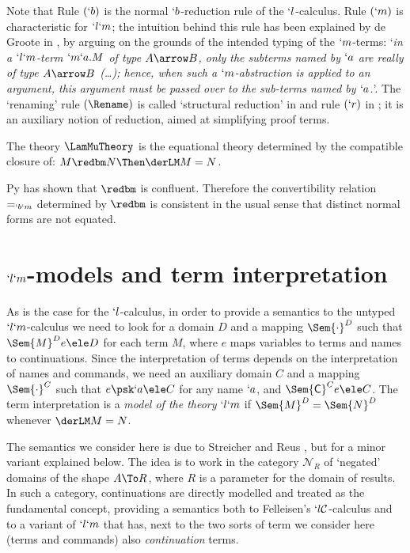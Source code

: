 \documentclass{CSML}
\begin{document}
Note that Rule $(`b)$ is the normal $`b$-reduction rule of the $`l$-calculus. 
Rule $(`m)$ is characteristic for $`l`m$; the intuition behind this rule has been explained by de Groote in \cite{deGroote'94}, by arguing on the grounds of the intended typing of the $`m$-terms: `\emph{in a $`l`m$-term $`m`a.M$ of type $A\arrow B$, only the subterms named by $`a$ are \emph{really} of type $A\arrow B$ (\ldots); hence, when such a $`m$-abstraction is applied to an argument, this argument must be passed over to the sub-terms named by $`a$.}'. 
The `renaming' rule $(\Rename)$ is called `structural reduction' in \cite{Parigot'92} and rule $(`r)$ in \cite{Py-PhD'98}; it is an auxiliary notion of reduction, aimed at simplifying proof terms.

 \begin{defi} \label{def:theories}
The theory $ \LamMuTheory$ is the equational theory determined by the compatible closure of: $M \redbm N \Then \derLM M = N $.
 \end{defi}

Py \cite{Py-PhD'98} has shown that %
$ \redbm$ is confluent.
Therefore the convertibility relation $=_{`b`m}$ determined by $ \redbm$ is consistent in the usual sense that distinct normal forms are not equated.

 \section{\texorpdfstring{$`l`m$}{lambda-mu}-models and term interpretation} \label{sec:semantics}

As is the case for the $`l$-calculus, in order to provide a semantics to the untyped $`l`m$-calculus we need to look for a domain $D$ and a mapping $\Sem{ \cdot}^D$ such that $\Sem{ M }^D{ e } \ele D$ for each term $M$, where $e$ maps variables to terms and names to continuations. 
Since the interpretation of terms depends on the interpretation of names and commands, we need an auxiliary domain $C$ and a mapping $\Sem{ \cdot}^C$ such that $e \psk `a \ele C$ for any name $`a$, and $\Sem{ \Cmd}^C{ e } \ele C$. The term interpretation is a \emph{model of the theory} $`l`m$ if $\Sem{ M }^D = \Sem{ N }^D$ whenever $\derLM M = N$.

The semantics we consider here is due to Streicher and Reus \cite{Streicher-Reus'98}, but for a minor variant explained below.
The idea is to work in the category ${\mathcal N}_R$ of `negated' domains of the shape $A\To R$, where $R$ is a parameter for the domain of results.
In such a category, continuations are directly modelled and treated as the fundamental concept, providing a semantics both to Felleisen's $ `l{\mathcal C}$-calculus and to a variant of $ `l`m$ that has, next to the two sorts of term we consider here (terms and commands) also \emph{continuation} terms.
\end{document}
